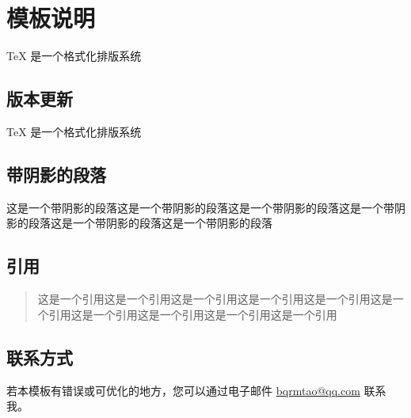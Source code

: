 \chapter{模板说明}
\label{chapter:templateinfo}

\TeX{} \index{\TeX} 是一个格式化排版系统

\section{版本更新}

\TeX{} \index{\TeX} 是一个格式化排版系统

\section{带阴影的段落}
\begin{shaded}
这是一个带阴影的段落这是一个带阴影的段落这是一个带阴影的段落这是一个带阴影的段落这是一个带阴影的段落这是一个带阴影的段落
\end{shaded}

\section{引用}\label{sec:quotation}
\begin{quote}\label{quotation:quote}
这是一个引用这是一个引用这是一个引用这是一个引用这是一个引用这是一个引用这是一个引用这是一个引用这是一个引用这是一个引用
\end{quote}

\section{联系方式}
若本模板有错误或可优化的地方，您可以通过电子邮件 \href{mailto:bqrmtao@qq.com}{bqrmtao@qq.com} 联系我。